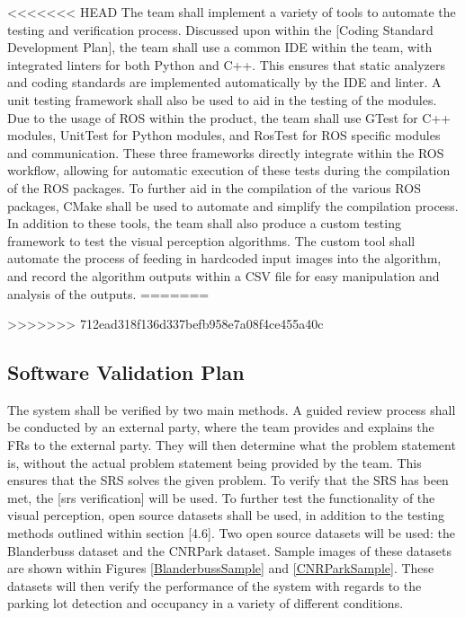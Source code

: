 \documentclass[12pt, titlepage]{article}
\begin{document}
<<<<<<< HEAD
The team shall implement a variety of tools to automate the testing and verification process. Discussed upon within the [Coding Standard Development Plan], the team shall use a common IDE within the team, with integrated linters for both Python and C++. This ensures that static analyzers and coding standards are implemented automatically by the IDE and linter. A unit testing framework shall also be used to aid in the testing of the modules. Due to the usage of ROS within the product, the team shall use GTest for C++ modules, UnitTest for Python modules, and RosTest for ROS specific modules and communication. These three frameworks directly integrate within the ROS workflow, allowing for automatic execution of these tests during the compilation of the ROS packages. To further aid in the compilation of the various ROS packages, CMake shall be used to automate and simplify the compilation process. In addition to these tools, the team shall also produce a custom testing framework to test the visual perception algorithms. The custom tool shall automate the process of feeding in hardcoded input images into the algorithm, and record the algorithm outputs within a CSV file for easy manipulation and analysis of the outputs. 
=======


>>>>>>> 712ead318f136d337befb958e7a08f4ce455a40c

\subsection{Software Validation Plan}

The system shall be verified by two main methods. A guided review process shall be conducted by an external party, where the team provides and explains the FRs to the external party. They will then determine what the problem statement is, without the actual problem statement being provided by the team. This ensures that the SRS solves the given problem. To verify that the SRS has been met, the [srs verification] will be used. To further test the functionality of the visual perception, open source datasets shall be used, in addition to the testing methods outlined within section [4.6]. Two open source datasets will be used: the Blanderbuss dataset and the CNRPark dataset. Sample images of these datasets are shown within Figures \ref{BlanderbussSample} and \ref{CNRParkSample}. These datasets will then verify the performance of the system with regards to the parking lot detection and occupancy in a variety of different conditions.  
\end{document}
